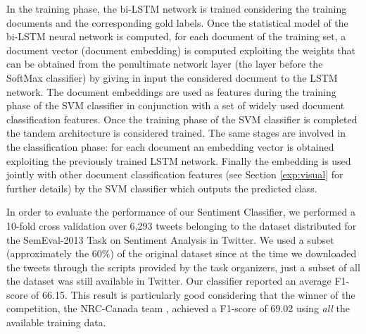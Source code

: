 In the training phase, the bi-LSTM network is trained considering the training documents and the corresponding gold labels. Once the statistical model of the bi-LSTM neural network is computed, for each document of the training set, a document vector (document embedding) is computed exploiting the weights that can be obtained from the penultimate network layer (the layer before the
SoftMax classifier) by giving in input the considered document to the LSTM network. The document embeddings are used as features during the training phase of the SVM classifier in conjunction  with  a  set  of  widely  used  document  classification features. Once the training phase of the SVM classifier is completed the tandem architecture is considered trained. The  same stages are involved in the classification phase: for each document an embedding vector is obtained exploiting the  previously trained LSTM network. Finally the embedding is used jointly with other document classification features (see Section \ref{exp:visual} for further details) by the SVM classifier which outputs the predicted class.

In order to evaluate the performance of our Sentiment Classifier, we performed a 10-fold cross validation over 6,293 tweets belonging to the dataset distributed for the SemEval-2013 Task on Sentiment Analysis in Twitter. We used a subset (approximately the 60\%) of the original dataset since at the time we downloaded the tweets through the scripts provided by the task organizers, just a subset of all the dataset was still available in Twitter. Our classifier reported an average F1-score of 66.15. This result is particularly good considering that the winner of the competition, the NRC-Canada team \cite{mohammad2013nrc}, achieved a F1-score of 69.02 using \emph{all} the available training data.

